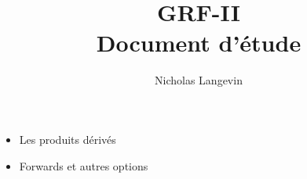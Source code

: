 \documentclass[10pt, french]{article}
\title{GRF-II \\ Document d'étude}
\author{Nicholas Langevin}
\begin{document}
\maketitle 
\vspace{50px}
\begin{center}
\begin{minipage}[c]{7.5cm}
    \begin{itemize}
        \LARGE
        \item[\color{black}\ding{235}] Les produits dérivés 
        \item[\color{black}  \ding{235}] Forwards et autres options
    \end{itemize}
\end{minipage}
\end{center}
\newpage
\end{document}
